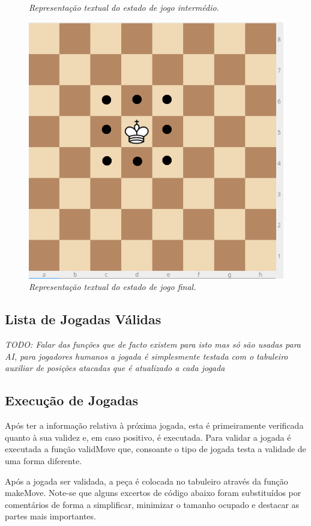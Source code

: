\documentclass[a4paper]{article}
\begin{document}
\begin{tiny}
\begin{figure}[H]
\caption{\textit{Representação textual do estado de jogo intermédio.}}
\label{fig:fig6}
\endminipage\hfill
{}
\includegraphics[scale=0.2]{board1.png}
\caption{\textit{Representação textual do estado de jogo final.}}
\label{fig:fig7}
\endminipage
\end{figure}
\end{tiny}

\subsection{Lista de Jogadas Válidas}
\textit{TODO: Falar das funções que de facto existem para isto mas só são usadas para AI, para jogadores humanos a jogada é simplesmente testada com o tabuleiro auxiliar de posições atacadas que é atualizado a cada jogada}

\subsection{Execução de Jogadas}
Após ter a informação relativa à próxima jogada, esta é primeiramente verificada quanto à sua validez e, em caso positivo, é executada.
Para validar a jogada é executada a função validMove que, consoante o tipo de jogada testa a validade de uma forma diferente.

Após a jogada ser validada, a peça é colocada no tabuleiro através da função makeMove.
Note-se que alguns excertos de código abaixo foram substituídos por comentários de forma a simplificar, minimizar o tamanho ocupado e destacar as partes mais importantes.
\end{document}

